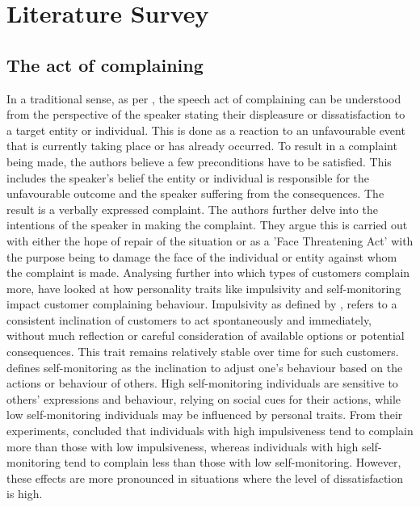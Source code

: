 \chapter{Literature Survey}

\section{The act of complaining}

In a traditional sense, as per \cite{olshtain_speechact_1987}, the speech act of complaining can be understood from the perspective of the speaker stating their displeasure or dissatisfaction to a target entity or individual. This is done as a reaction to an unfavourable event that is currently taking place or has already occurred. To result in a complaint being made, the authors believe a few preconditions have to be satisfied. This includes the speaker's belief the entity or individual is responsible for the unfavourable outcome and the speaker suffering from the consequences. The result is a verbally expressed complaint. 
The authors further delve into the intentions of the speaker in making the complaint. They argue this is carried out with either the hope of repair of the situation or as a 'Face Threatening Act' with the purpose being to damage the face of the individual or entity against whom the complaint is made. 
\newline \newline
Analysing further into which types of customers complain more, \cite{sharma_complainers_2010} have looked at how personality traits like impulsivity and self-monitoring impact customer complaining behaviour. Impulsivity as defined by \cite{rookNormativeInfluencesImpulsive1995}, refers to a consistent inclination of customers to act spontaneously and immediately,  without much reflection or careful consideration of available options or potential consequences. This trait remains relatively stable over time for such customers. \cite{bechererSelfMonitoringModeratingVariable1978} defines self-monitoring as the inclination to adjust one's behaviour based on the actions or behaviour of others. High self-monitoring individuals are sensitive to others' expressions and behaviour, relying on social cues for their actions, while low self-monitoring individuals may be influenced by personal traits. 
From their experiments, \cite{sharma_complainers_2010} concluded that individuals with high impulsiveness tend to complain more than those with low impulsiveness, whereas individuals with high self-monitoring tend to complain less than those with low self-monitoring. However, these effects are more pronounced in situations where the level of dissatisfaction is high.


